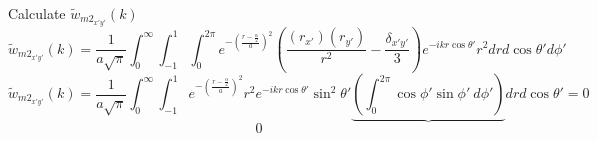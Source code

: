 \documentclass[letterpaper,twocolumn,amsmath,amssymb,prb]{revtex4-1}
\begin{document}
\begin{widetext}
Calculate $\widetilde{w}_{{m2}_{x'y'}}(k)$ 
\begin{equation}{\widetilde{w}_{{m2}_{x'y'}}(k)=\frac{1}{a\sqrt{\pi}}\int_{0}^{\infty}\int_{-1}^{1}\int_{0}^{2\pi}e^{-\left(\frac{r-\frac{\alpha}{2}}{a}\right)^2}\left(\frac{(r_{x'})(r_{y'})}{r^2}-\frac{\delta_{x'y'}}{3}\right)e^{-ikr\cos\theta'}r^2d{r}d{\cos\theta'}d{\phi'}}\end{equation}
\begin{equation}{\widetilde{w}_{{m2}_{x'y'}}(k)=\frac{1}{a\sqrt{\pi}}\int_{0}^{\infty}\int_{-1}^{1}e^{-\left(\frac{r-\frac{\alpha}{2}}{a}\right)^2}r^2e^{-ikr\cos\theta'}\sin^2\theta'\underbrace{\left(\int_{0}^{2\pi}\cos\phi'\sin{\phi'}~d{\phi'}\right)}d{r}d{\cos\theta'}=0}\end{equation}
$~~~~~~~~~~~~~~~~~~~~~~~~~~~~~~~~~~~~~~~~~~~~~~~~~~~~~~~~~~~~~~~~~~~~~~~~~~~~~~~~0$


\end{widetext}
\end{document}
